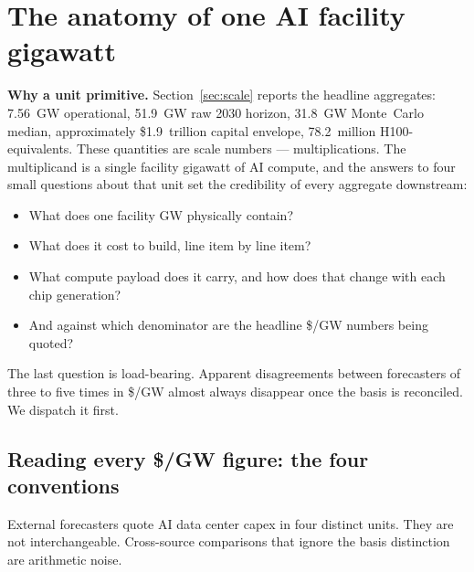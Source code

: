 %
%
\section{The anatomy of one AI facility gigawatt}
\label{sec:anatomy}

\textbf{Why a unit primitive.} Section~\ref{sec:scale} reports the headline aggregates: 7.56~GW operational, 51.9~GW raw 2030 horizon, 31.8~GW Monte~Carlo median, approximately \$1.9~trillion capital envelope, 78.2~million H100-equivalents. These quantities are scale numbers --- multiplications. The multiplicand is a single facility gigawatt of AI compute, and the answers to four small questions about that unit set the credibility of every aggregate downstream:

\begin{itemize}\itemsep2pt
\item What does one facility GW physically contain?
\item What does it cost to build, line item by line item?
\item What compute payload does it carry, and how does that change with each chip generation?
\item And against which denominator are the headline \$/GW numbers being quoted?
\end{itemize}

The last question is load-bearing. Apparent disagreements between forecasters of three to five times in \$/GW almost always disappear once the basis is reconciled. We dispatch it first.

\subsection{Reading every \$/GW figure: the four conventions}
\label{subsec:basis-conventions}

External forecasters quote AI data center capex in four distinct units. They are not interchangeable. Cross-source comparisons that ignore the basis distinction are arithmetic noise.

